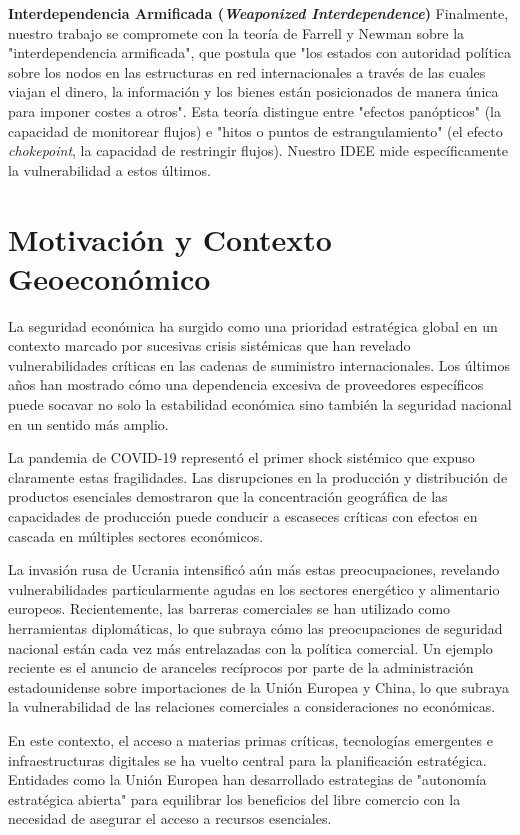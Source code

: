 \documentclass[final,1p,times,authoryear]{elsarticle}
\begin{document}
\textbf{Interdependencia Armificada (\textit{Weaponized Interdependence})}
Finalmente, nuestro trabajo se compromete con la teoría de Farrell y Newman \citeyear{farrell2019weaponized} sobre la "interdependencia armificada", que postula que "los estados con autoridad política sobre los nodos en las estructuras en red internacionales a través de las cuales viajan el dinero, la información y los bienes están posicionados de manera única para imponer costes a otros". Esta teoría distingue entre "efectos panópticos" (la capacidad de monitorear flujos) e "hitos o puntos de estrangulamiento" (el efecto \textit{chokepoint}, la capacidad de restringir flujos). Nuestro IDEE mide específicamente la vulnerabilidad a estos últimos.

\section{Motivación y Contexto Geoeconómico}

La seguridad económica ha surgido como una prioridad estratégica global en un contexto marcado por sucesivas crisis sistémicas que han revelado vulnerabilidades críticas en las cadenas de suministro internacionales. Los últimos años han mostrado cómo una dependencia excesiva de proveedores específicos puede socavar no solo la estabilidad económica sino también la seguridad nacional en un sentido más amplio.

La pandemia de COVID-19 representó el primer shock sistémico que expuso claramente estas fragilidades. Las disrupciones en la producción y distribución de productos esenciales demostraron que la concentración geográfica de las capacidades de producción puede conducir a escaseces críticas con efectos en cascada en múltiples sectores económicos.

La invasión rusa de Ucrania intensificó aún más estas preocupaciones, revelando vulnerabilidades particularmente agudas en los sectores energético y alimentario europeos. Recientemente, las barreras comerciales se han utilizado como herramientas diplomáticas, lo que subraya cómo las preocupaciones de seguridad nacional están cada vez más entrelazadas con la política comercial. Un ejemplo reciente es el anuncio de aranceles recíprocos por parte de la administración estadounidense sobre importaciones de la Unión Europea y China, lo que subraya la vulnerabilidad de las relaciones comerciales a consideraciones no económicas.

En este contexto, el acceso a materias primas críticas, tecnologías emergentes e infraestructuras digitales se ha vuelto central para la planificación estratégica. Entidades como la Unión Europea han desarrollado estrategias de "autonomía estratégica abierta" para equilibrar los beneficios del libre comercio con la necesidad de asegurar el acceso a recursos esenciales.
\end{document}
